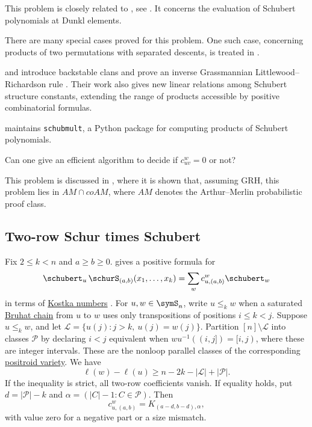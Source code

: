 This problem is closely related to
\label{fominKirillovConjecture},
see \cite[Conjecture 8.1 and Problem 8.3]{FominKirillov1999}.
It concerns the evaluation of Schubert polynomials at Dunkl elements.


There are many special cases proved for this problem.  One such case,
concerning products of two permutations with separated descents, is treated
in \cite{Huang2022}.

 and  introduce backstable clans and
prove an inverse Grassmannian Littlewood--Richardson rule
\cite{PechenikWeigandt2024}.  Their work also gives new linear relations among
Schubert structure constants, extending the range of products accessible by
positive combinatorial formulas.

 maintains \texttt{schubmult}, a Python package for
computing products of Schubert polynomials.


\begin{problem}
Can one give an efficient algorithm to decide if $c^w_{uv} = 0$ or not?
\end{problem}
This problem is discussed in \cite{PakRobichaux2025xI}, where it is shown
that, assuming GRH, this problem lies in $AM \cap coAM$,
where $AM$ denotes the Arthur--Merlin probabilistic proof class.



\subsection[schubertTwoRowProduct]{Two-row Schur times Schubert}

Fix $2\leq k<n$ and $a\geq b\geq0$.
 gives a positive formula for
\[
 \schubert_u\,\schurS_{(a,b)}(x_1,\dotsc,x_k)
   =\sum_w c^w_{u,(a,b)}\schubert_w
\]
in terms of \hyperref[kostkaCoefficient]{Kostka numbers}
\cite[Thm.~1.1]{Yu2026TwoRowSchubertx}.
For $u,w\in\symS_n$, write $u\leq_k w$ when a saturated
\hyperref[bruhatOrder]{Bruhat chain} from $u$ to $w$ uses only transpositions
of positions $i\leq k<j$. Suppose $u\leq_k w$, and
let $\mathcal L=\{u(j):j>k,\ u(j)=w(j)\}$.
Partition $[n]\setminus\mathcal L$ into classes $\mathcal P$ by declaring
$i<j$ equivalent when $wu^{-1}((i,j])=[i,j)$, where these are integer intervals.
These are the nonloop parallel classes of the corresponding
\hyperref[positroidVarietyDefinition]{positroid variety}.
We have
\[
 \ell(w)-\ell(u)\geq n-2k-|\mathcal L|+|\mathcal P|.
\]
If the inequality is strict, all two-row coefficients vanish. If equality
holds, put $d=|\mathcal P|-k$ and $\alpha=(|C|-1:C\in\mathcal P)$. Then
\[
 c^w_{u,(a,b)}=K_{(a-d,b-d),\alpha},
\]
with value zero for a negative part or a size mismatch.

